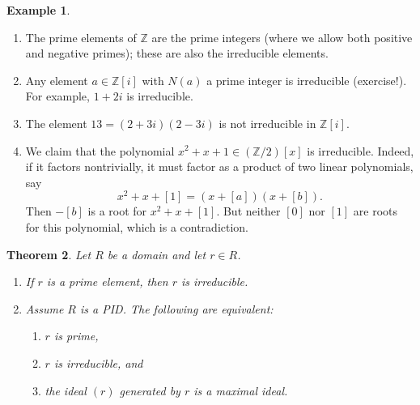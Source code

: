 \documentclass[12pt]{report}
\newtheorem{theorem}{Theorem}[chapter]
\numberwithin{equation}{section}
\numberwithin{theorem}{chapter}
\theoremstyle{definition}
\newtheorem{example}[theorem]{Example}
\newtheorem*{basic properties}{Basic Properties}
\newtheorem*{Important Remark}{Important Remark}
\begin{document}
\begin{example}$\,$
\begin{enumerate}
\item The prime elements of $\mathbb{Z}$ are the prime integers (where we allow both positive and negative primes); these are also the irreducible elements.
\item Any element $a \in \mathbb{Z}[i]$ with $N(a)$ a prime integer is irreducible (exercise!). For example, $1+2i$ is irreducible.
\item The element $13=(2+3i)(2-3i)$ is not irreducible in $\mathbb{Z}[i]$.
\item We claim that the polynomial $x^2+x+1 \in (\mathbb{Z}/2)[x]$ is irreducible. Indeed, if it factors nontrivially, it must factor as a product of two linear polynomials, say 
$$x^2+x+[1]=(x+[a])(x+[b]).$$ 
Then $-[b]$ is a root for $x^2+x+[1]$. But neither $[0]$ nor $[1]$ are roots for this polynomial, which is a contradiction.
\end{enumerate}
 \end{example}
 

\begin{theorem}\label{domain prime irreducible elements}
Let $R$ be a domain and let $r\in R$. 
\begin{enumerate}
\item If $r$ is a prime element, then $r$ is irreducible. 
\item Assume $R$ is a PID. The following are equivalent:
  \begin{enumerate}
  \item $r$ is prime,
  \item $r$ is irreducible, and
    \item the ideal $(r)$ generated by $r$ is a maximal ideal.
    \end{enumerate}
    \end{enumerate}
\end{theorem}
\end{document}
